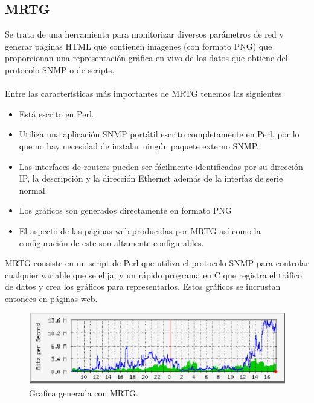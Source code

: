 \documentclass[letterpaper]{article}
\begin{document}
\subsection{MRTG} %
\label{sub:MRTG}
Se trata de una herramienta para monitorizar diversos parámetros de red y
generar páginas HTML que contienen imágenes (con formato PNG) que proporcionan
una representación gráfica en vivo de los datos que obtiene del protocolo SNMP o de
scripts.\\\\
Entre las características más importantes de MRTG tenemos las siguientes:
\begin{itemize}
  \item Está escrito en Perl.
  \item  Utiliza una aplicación SNMP portátil escrito completamente en Perl, por lo
que no hay necesidad de instalar ningún paquete externo SNMP.
  \item  Las interfaces de routers pueden ser fácilmente identificadas por su dirección
IP, la descripción y la dirección Ethernet además de la interfaz de serie
normal.
  \item Los gráficos son generados directamente en formato PNG
  \item El aspecto de las páginas web producidas por MRTG así como la
configuración de este son altamente configurables.
\end{itemize}
MRTG consiste en un script de Perl que utiliza el protocolo SNMP para
controlar cualquier variable que se elija, y un rápido programa en C que registra el
tráfico de datos y crea los gráficos para representarlos. Estos gráficos se incrustan
entonces en páginas web.
\begin{figure}[H]
  \centering
  \includegraphics[width=\textwidth]{images/MRTG.png}
  \caption{Grafica generada con MRTG.}\label{fig:mrtg}
\end{figure}
\end{document}

